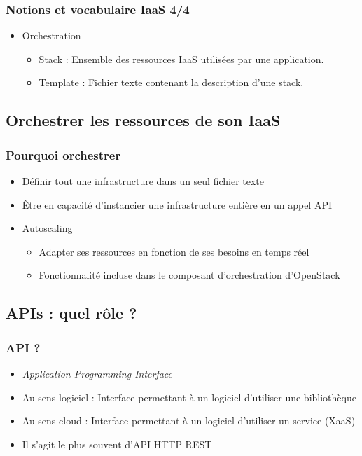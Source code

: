   \begin{frame}
    \frametitle{Notions et vocabulaire IaaS 4/4}
    \begin{itemize}
      \item Orchestration \pause
      \begin{itemize}
        \item Stack : Ensemble des ressources IaaS utilisées par une application. \pause
        \item Template : Fichier texte contenant la description d'une stack. \pause
      \end{itemize}
    \end{itemize}
  \end{frame}

  \subsection[Orchestration]{Orchestrer les ressources de son IaaS}

  \begin{frame}
    \frametitle{Pourquoi orchestrer}
    \begin{itemize}
      \item Définir tout une infrastructure dans un seul fichier texte
      \item Être en capacité d'instancier une infrastructure entière en un appel API
      \item Autoscaling
      \begin{itemize}
        \item Adapter ses ressources en fonction de ses besoins en temps réel
        \item Fonctionnalité incluse dans le composant d'orchestration d'OpenStack
      \end{itemize}
    \end{itemize}
  \end{frame}

  \subsection[APIs]{APIs : quel rôle ?}

  \begin{frame}
    \frametitle{API ?}
    \begin{itemize}
      \item \textit{Application Programming Interface}
      \item Au sens logiciel : Interface permettant à un logiciel d'utiliser une bibliothèque
      \item Au sens cloud : Interface permettant à un logiciel d'utiliser un service (XaaS)
      \item Il s'agit le plus souvent d'API HTTP REST
    \end{itemize}
  \end{frame}

